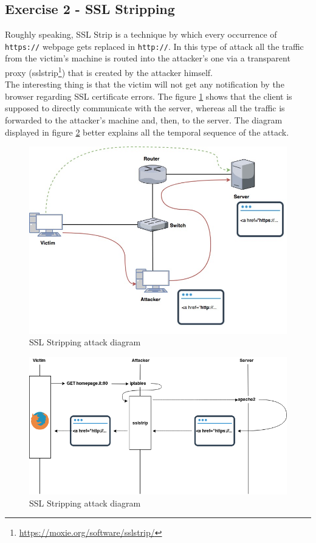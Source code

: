 \documentclass[final]{article}
\begin{document}
\subsection{Exercise 2 - SSL Stripping}
Roughly speaking, SSL Strip is a technique by which every occurrence of \texttt{https://} webpage gets replaced in \texttt{http://}.
In this type of attack all the traffic from the victim’s machine is routed into the attacker's one via a transparent proxy
(sslstrip\footnote{\url{https://moxie.org/software/sslstrip/}}) that is created by the attacker himself.\\
The interesting thing is that the victim will not get any notification by the browser regarding SSL certificate errors.
The figure \ref{sslstrip} shows that the client is supposed to directly communicate with the server,
whereas all the traffic is forwarded to the attacker's machine and, then, to the server.
The diagram displayed in figure \ref{sslstrip_time} better explains all the temporal sequence of the attack.\\
\begin{figure}[h]
  \center
  \includegraphics[width=\textwidth]{../figures/sslstrip}
  \caption{SSL Stripping attack diagram}
  \label{sslstrip}
\end{figure}
\begin{figure}[h]
  \center
  \includegraphics[width=\textwidth]{../figures/sslstrip_time}
  \caption{SSL Stripping attack diagram}
  \label{sslstrip_time}
\end{figure}
\end{document}

